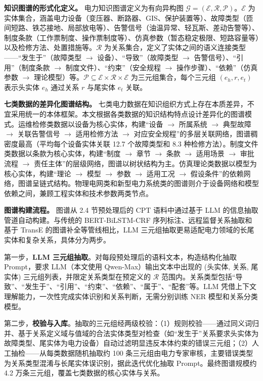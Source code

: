\documentclass[fontset=fandol,type=master,campus=shenzhen,etitleauto=true]{hithesisbook}
\begin{document}
\textbf{知识图谱的形式化定义。} 电力知识图谱定义为有向异构图 $\mathcal{G} = (\mathcal{E}, \mathcal{R}, \mathcal{P})$。$\mathcal{E}$ 为实体集合，涵盖电力设备（变压器、断路器、GIS、保护装置等）、故障类型（匝间短路、铁芯接地、局部放电等）、告警信号（油温异常、轻瓦斯、差动告警等）、制度条款（工作票制度、操作票制度等）、仿真参数（暂态稳定极限、短路容量等）以及检修方法、处置措施等。$\mathcal{R}$ 为关系集合，定义了实体之间的语义连接类型------``发生于''（故障类型 $\to$ 设备）、``导致''（故障类型 $\to$ 告警信号）、``引用''（制度条款 $\to$ 制度文件）、``约束''（安全规程 $\to$ 操作步骤）、``依赖''（仿真参数 $\to$ 理论模型）等。$\mathcal{P} \subseteq \mathcal{E} \times \mathcal{R} \times \mathcal{E}$ 为三元组集合，每个三元组 $(e_h, r, e_t)$ 表示头实体 $e_h$ 通过关系 $r$ 与尾实体 $e_t$ 关联。

\textbf{七类数据的差异化图谱结构。} 七类电力数据在知识组织方式上存在本质差异，不宜采用统一的本体框架。本文根据各类数据的知识结构特点设计差异化的图谱模式。运维检修类数据以设备为核心实体，构建``设备 $\to$ 所属系统 $\to$ 典型故障 $\to$ 关联告警信号 $\to$ 适用检修方法 $\to$ 对应安全规程''的多层关联网络，图谱稠密度最高（平均每个设备实体关联 12.7 个故障类型和 8.3 种检修方法）。制度文件类数据以条款为核心实体，构建``制度 $\to$ 章节 $\to$ 条款 $\to$ 适用场景 $\to$ 审批流程 $\to$ 责任主体''的层级网络，图谱以树状结构为主。仿真理论类数据以模型为核心实体，构建``理论 $\to$ 模型 $\to$ 参数 $\to$ 适用工况 $\to$ 假设条件''的依赖网络，图谱呈链式结构。物理电网类和新型电力系统类的图谱则介于设备网络和模型依赖之间，兼顾工程实体和技术参数两类节点。

\textbf{图谱构建流程。} 图谱从 2.4 节预处理后的 CPT 语料中通过基于 LLM 的信息抽取管道自动构建。与传统的 BERT-BiLSTM-CRF 序列标注\cite{ref70,ref71}、远程监督关系抽取\cite{ref72,ref73}和基于 TransE 的图谱补全\cite{ref74}等管线相比，LLM 三元组抽取更易适配电力领域的长尾实体和复杂关系，具体分为两步。

第一步，\textbf{LLM 三元组抽取}。对每段预处理后的语料文本，构造结构化抽取 Prompt，要求 LLM（本文使用 Qwen-Max）输出文本中出现的 (头实体, 关系, 尾实体) 三元组列表，并限定关系类型在预定义的 $\mathcal{R}$ 范围内。关系类型包括``导致''、``发生于''、``引用''、``约束''、``依赖''、``属于''、``配套''等。LLM 凭借上下文理解能力，一次性完成实体识别和关系判断，无需分别训练 NER 模型和关系分类模型。

第二步，\textbf{校验与入库}。抽取的三元组经两级校验：（1）规则校验------通过同义词归并、基于关系定义域与值域的合法实体类型对检查（如``发生于''关系要求头实体为故障类型、尾实体为电力设备）自动过滤明显违反本体约束的错误三元组；（2）人工抽检------从每类数据随机抽取约 100 条三元组由电力专家审核，主要错误类型为关系类型混淆与长尾实体误识别，据此迭代优化抽取 Prompt。最终图谱规模约 4.2 万条三元组，覆盖七类数据的核心实体与关系。
\end{document}
